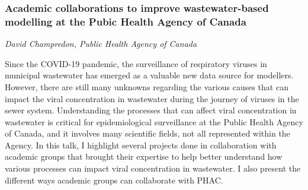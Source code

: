 \subsubsection*{Academic collaborations to improve wastewater-based modelling at the Pubic Health Agency of Canada}
\textit{David Champredon, Public Health Agency of Canada}

Since the COVID-19 pandemic, the surveillance of respiratory viruses in municipal wastewater has emerged as a valuable new data source for modellers.
However, there are still many unknowns regarding the various causes that can impact the viral concentration in wastewater during the journey of viruses in the sewer system.
Understanding the processes that can affect viral concentration in wastewater is critical for epidemiological surveillance at the Public Health Agency of Canada, and it involves many scientific fields, not all represented within the Agency.
In this talk, I highlight several projects done in collaboration with academic groups that brought their expertise to help better understand how various processes can impact viral concentration in wastewater. I also present the different ways academic groups can collaborate with PHAC.




























